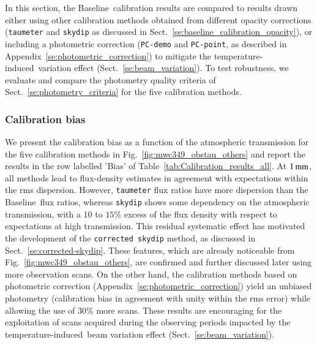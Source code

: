 \documentclass[traditionalabstract]{aa}
\newcommand{\afternoon}{temperature-induced}
\newcommand{\baseline}{Baseline}%
\begin{document}
{In this section, the \baseline\ calibration results are compared to
results drawn either using other calibration methods obtained from different
opacity corrections ({\tt taumeter} and {\tt skydip} as
discussed in Sect.~\ref{se:baseline_calibration_opacity}), or
including a photometric correction ({\tt PC-demo} and {\tt PC-point},
as described in Appendix~\ref{se:photometric_correction}) to mitigate
the \afternoon\ variation effect (Sect.~\ref{se:beam_variation}).
To test robustness, we evaluate and compare the photometry quality criteria of
Sect.~\ref{se:photometry_criteria} for the five calibration methods.


\subsubsection{Calibration bias}
\label{se:calibration_bias_all}

We present the calibration bias as a function of the atmospheric
transmission for the five calibration methods in
Fig.~\ref{fig:mwc349_obstau_others} and report the results in the row
labelled 'Bias' of Table~\ref{tab:Calibration_results_all}.
At $1\,\rm{mm}$, all methods lead to flux-density estimates in
agreement with expectations within the rms dispersion. However,
{\tt taumeter} flux ratios have more dispersion than
the \baseline\ flux ratios, whereas {\tt skydip} shows some
dependency on the atmospheric
transmission, with a 10 to $15\%$ excess of the flux density with
respect to expectations at high transmission. This residual
systematic effect has motivated the development of the {\tt corrected
  skydip} method, as discussed in
Sect.~\ref{se:corrected-skydip}. These features, which are
already noticeable from Fig.~\ref{fig:mwc349_obstau_others}, are
confirmed and further discussed later using more observation scans. On
the other hand, the calibration methods based on photometric
correction (Appendix~\ref{se:photometric_correction}) yield an
unbiased photometry (calibration bias in agreement with unity
within the rms error) while allowing the use of $30\%$ more
scans. These results are encouraging for the exploitation of scans
acquired during the observing periods
impacted by the \afternoon\ beam variation effect
(Sect.~\ref{se:beam_variation}).

}
\end{document}
